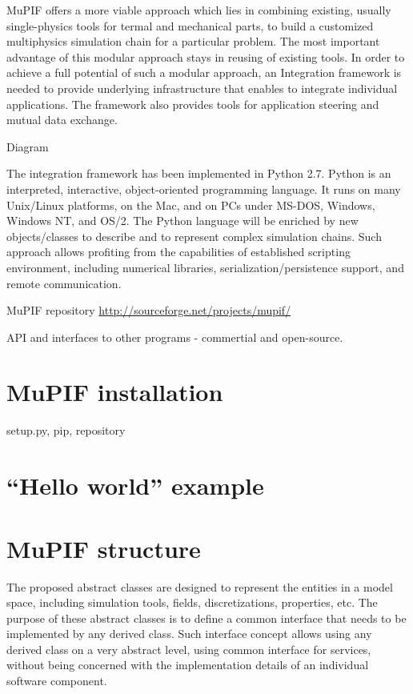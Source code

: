 \documentclass[a4paper,11pt]{article}
\begin{document}
MuPIF offers a more viable approach which lies in combining existing, usually single-physics tools for termal and mechanical parts, to build a customized multiphysics simulation chain for a particular problem. The most important advantage of this modular approach stays in reusing of existing tools. In order to achieve a full potential of such a modular approach, an Integration framework is needed to provide underlying infrastructure that enables to integrate individual applications. The framework also provides tools for application steering and mutual data exchange. 

Diagram

The integration framework has been implemented in Python 2.7. Python is an interpreted, interactive, object-oriented programming language. It runs on many Unix/Linux platforms, on the Mac, and on PCs under MS-DOS, Windows, Windows NT, and OS/2. The Python language will be enriched by new objects/classes to describe and to represent complex simulation chains. Such approach allows profiting from the capabilities of established scripting environment, including numerical libraries, serialization/persistence support, and remote communication.

MuPIF repository \url{http://sourceforge.net/projects/mupif/}

API and interfaces to other programs - commertial and open-source.

\section{MuPIF installation}

setup.py, pip, repository

\section{``Hello world'' example}


\section{MuPIF structure}
The proposed abstract classes are designed to represent the entities in a model space, including simulation tools, fields, discretizations, properties, etc. The purpose of these abstract classes is to define a common interface that needs to be implemented by any derived class. Such interface concept allows using any derived class on a very abstract level, using common interface for services, without being concerned with the implementation details of an individual software component. 
\end{document}
